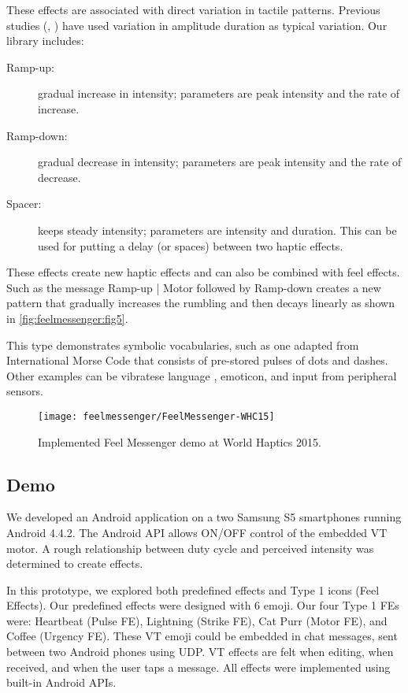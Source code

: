 These effects are associated with direct variation in tactile patterns. Previous studies (\eg, \cite{Brewster2004,MacLean2003}) have used variation in amplitude  duration as typical variation. Our library includes:

\begin{description}
	\item[Ramp-up:] gradual increase in intensity; parameters are peak intensity and the rate of increase.
	\item[Ramp-down:] gradual decrease in intensity; parameters are peak intensity and the rate of decrease.
	\item[Spacer:] keeps steady intensity; parameters are intensity and duration. This can be used for putting a delay (or spaces) between two haptic effects.
\end{description}

These effects create new haptic effects and can also be combined with feel effects. Such as the message Ramp-up | Motor followed by Ramp-down creates a new pattern that gradually increases the rumbling and then decays linearly as shown in \autoref{fig:feelmessenger:fig5}.

This type demonstrates symbolic vocabularies, such as one adapted from International Morse Code that consists of pre-stored pulses of dots and dashes. Other examples can be vibratese language \cite{Tan1997}, emoticon, and input from peripheral sensors.



\begin{figure}[htbp] %
   \centering
   \texttt{[image: feelmessenger/FeelMessenger-WHC15]} 
   \caption{Implemented Feel Messenger demo at World Haptics 2015.}
   \label{fig:feelmessenger:demo}
\end{figure}

\subsection{Demo}
We developed an Android application on a two Samsung S5 smartphones running Android 4.4.2.
The Android API allows ON/OFF control of the embedded VT motor.
A rough relationship between duty cycle and perceived intensity was determined to create effects.

In this prototype, we explored both predefined effects and Type 1 icons (Feel Effects).
Our predefined effects were designed with 6 emoji.
Our four Type 1 FEs were:
Heartbeat (Pulse FE),
Lightning (Strike FE),
Cat Purr (Motor FE), and
Coffee (Urgency FE).
These VT emoji could be embedded in chat messages, sent between two Android phones using UDP.
VT effects are felt when editing, when received, and when the user taps a message.
All effects were implemented using built-in Android APIs.


